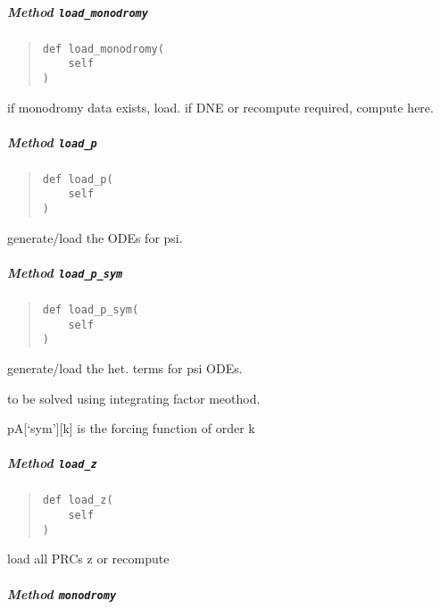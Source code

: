\documentclass[english,a4paper,oneside]{article}
\let\oldsubparagraph\subparagraph
\renewcommand{\subparagraph}[1]{\oldsubparagraph{#1}\mbox{}}
\begin{document}
\hypertarget{StrongCoupling.StrongCoupling.load_monodromy}{%
\subparagraph{\texorpdfstring{Method
\texttt{load\_monodromy}}{Method load\_monodromy}}\label{StrongCoupling.StrongCoupling.load_monodromy}}

\begin{quote}
\begin{verbatim}
def load_monodromy(
    self
)
\end{verbatim}
\end{quote}

if monodromy data exists, load. if DNE or recompute required, compute
here.

\hypertarget{StrongCoupling.StrongCoupling.load_p}{%
\subparagraph{\texorpdfstring{Method
\texttt{load\_p}}{Method load\_p}}\label{StrongCoupling.StrongCoupling.load_p}}

\begin{quote}
\begin{verbatim}
def load_p(
    self
)
\end{verbatim}
\end{quote}

generate/load the ODEs for psi.

\hypertarget{StrongCoupling.StrongCoupling.load_p_sym}{%
\subparagraph{\texorpdfstring{Method
\texttt{load\_p\_sym}}{Method load\_p\_sym}}\label{StrongCoupling.StrongCoupling.load_p_sym}}

\begin{quote}
\begin{verbatim}
def load_p_sym(
    self
)
\end{verbatim}
\end{quote}

generate/load the het. terms for psi ODEs.

to be solved using integrating factor meothod.

pA{[}`sym'{]}{[}k{]} is the forcing function of order k

\hypertarget{StrongCoupling.StrongCoupling.load_z}{%
\subparagraph{\texorpdfstring{Method
\texttt{load\_z}}{Method load\_z}}\label{StrongCoupling.StrongCoupling.load_z}}

\begin{quote}
\begin{verbatim}
def load_z(
    self
)
\end{verbatim}
\end{quote}

load all PRCs z or recompute

\hypertarget{StrongCoupling.StrongCoupling.monodromy}{%
\subparagraph{\texorpdfstring{Method
\texttt{monodromy}}{Method monodromy}}\label{StrongCoupling.StrongCoupling.monodromy}}
\end{document}
